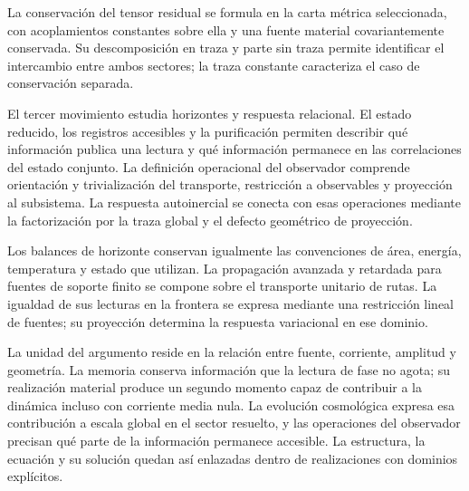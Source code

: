 La conservación del tensor residual se formula en la carta métrica
seleccionada, con acoplamientos constantes sobre ella y una fuente
material covariantemente conservada. Su descomposición en traza y parte
sin traza permite identificar el intercambio entre ambos sectores;
la traza constante caracteriza el caso de conservación separada.

El tercer movimiento estudia horizontes y respuesta relacional. El estado
reducido, los registros accesibles y la purificación permiten describir
qué información publica una lectura y qué información permanece en las
correlaciones del estado conjunto. La definición operacional del
observador comprende orientación y trivialización del transporte,
restricción a observables y proyección al subsistema. La respuesta
autoinercial se conecta con esas operaciones mediante la factorización
por la traza global y el defecto geométrico de proyección.

Los balances de horizonte conservan igualmente las convenciones de
área, energía, temperatura y estado que utilizan.
La propagación avanzada y retardada para fuentes de soporte finito se
compone sobre el transporte unitario de rutas. La igualdad de sus lecturas en la frontera se
expresa mediante una restricción lineal de fuentes; su proyección
determina la respuesta variacional en ese dominio.

La unidad del argumento reside en la relación entre fuente, corriente,
amplitud y geometría. La memoria conserva información que la lectura de
fase no agota; su realización material produce un segundo momento capaz
de contribuir a la dinámica incluso con corriente media nula. La
evolución cosmológica expresa esa contribución a escala global en el
sector resuelto, y las operaciones del observador precisan qué parte de
la información permanece accesible. La estructura, la ecuación y su
solución quedan así enlazadas dentro de realizaciones con dominios
explícitos.
